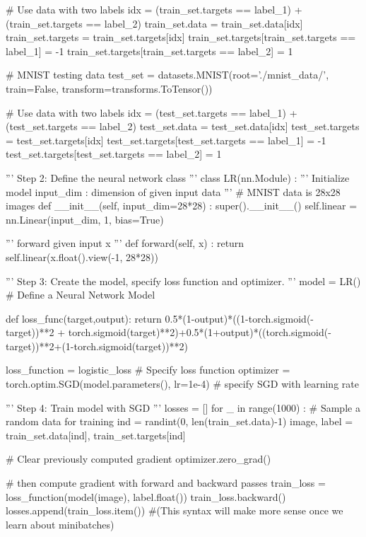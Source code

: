 \documentclass[10pt]{article}
\begin{document}
\begin{python}
# Use data with two labels
idx = (train_set.targets == label_1) + (train_set.targets == label_2)
train_set.data = train_set.data[idx]
train_set.targets = train_set.targets[idx]
train_set.targets[train_set.targets == label_1] = -1
train_set.targets[train_set.targets == label_2] = 1

# MNIST testing data
test_set = datasets.MNIST(root='./mnist_data/', train=False, transform=transforms.ToTensor())

# Use data with two labels
idx = (test_set.targets == label_1) + (test_set.targets == label_2)
test_set.data = test_set.data[idx]
test_set.targets = test_set.targets[idx]
test_set.targets[test_set.targets == label_1] = -1
test_set.targets[test_set.targets == label_2] = 1

'''
Step 2: Define the neural network class
'''
class LR(nn.Module) :
    '''
    Initialize model
        input_dim : dimension of given input data
    '''
    # MNIST data is 28x28 images
    def __init__(self, input_dim=28*28) :
        super().__init__()
        self.linear = nn.Linear(input_dim, 1, bias=True)

    ''' forward given input x '''
    def forward(self, x) :
        return self.linear(x.float().view(-1, 28*28))

'''
Step 3: Create the model, specify loss function and optimizer.
'''
model = LR()                                   # Define a Neural Network Model

def loss_func(target,output):
    return 0.5*(1-output)*((1-torch.sigmoid(-target))**2 + torch.sigmoid(target)**2)+0.5*(1+output)*((torch.sigmoid(-target))**2+(1-torch.sigmoid(target))**2)

loss_function = logistic_loss                                                   # Specify loss function
optimizer = torch.optim.SGD(model.parameters(), lr=1e-4)   # specify SGD with learning rate

'''
Step 4: Train model with SGD
'''
losses = []
for _ in range(1000) :
    # Sample a random data for training
    ind = randint(0, len(train_set.data)-1)
    image, label = train_set.data[ind], train_set.targets[ind]

    # Clear previously computed gradient
    optimizer.zero_grad()

    # then compute gradient with forward and backward passes
    train_loss = loss_function(model(image), label.float())
    train_loss.backward()
    losses.append(train_loss.item())
    #(This syntax will make more sense once we learn about minibatches)


\end{python}
\end{document}
